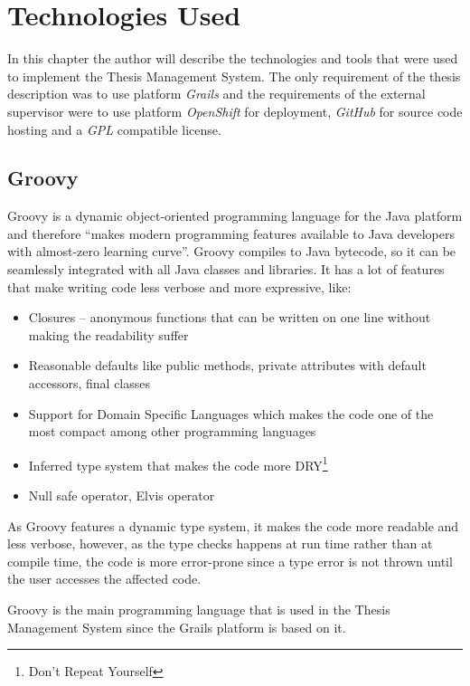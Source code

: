 \chapter{Technologies Used}

In this chapter the author will describe the technologies and tools that were used to implement the Thesis Management System. The only requirement of the thesis description was to use platform \emph{Grails} and the requirements of the external supervisor were to use platform \emph{OpenShift} for deployment, \emph{GitHub} for source code hosting and a \emph{GPL} compatible license.

\section{Groovy}

Groovy is a dynamic object-oriented programming language for the Java platform and therefore ``makes modern programming features available to Java developers with almost-zero learning curve''\cite{groovy-homepage}. Groovy compiles to Java bytecode, so it can be seamlessly integrated with all Java classes and libraries\cite{groovy-homepage}. It has a lot of features that make writing code less verbose and more expressive, like:

\begin{itemize}
    \item Closures -- anonymous functions that can be written on one line without making the readability suffer
    \item Reasonable defaults like public methods, private attributes with default accessors, final classes
    \item Support for Domain Specific Languages which makes the code one of the most compact among other programming languages
    \item Inferred type system that makes the code more DRY\footnote{Don't Repeat Yourself}
    \item Null safe operator, Elvis operator
\end{itemize}

As Groovy features a dynamic type system, it makes the code more readable and less verbose, however, as the type checks happens at run time rather than at compile time, the code is more error-prone since a type error is not thrown until the user accesses the affected code.

Groovy is the main programming language that is used in the Thesis Management System since the Grails platform is based on it.

